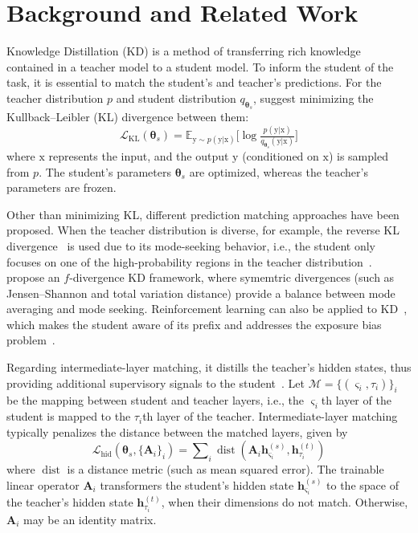 \section{Background and Related Work}
Knowledge Distillation (KD) is a method of transferring rich knowledge contained in a teacher model to a student model. To inform the student of the task, it is essential to match the student's and teacher's predictions.  For the teacher distribution $p$ and student distribution $q_{\bm\theta_s}$, \citet{hintonkd} suggest minimizing the Kullback--Leibler (KL) divergence between them: 
\begin{equation}
    \mathcal{L}_{\text{KL}}(\bm\theta_s) =  
    \mathbb{E}_{\mathrm y\sim p(\mathrm y| \mathrm x)}\big[
        \log{
            \tfrac{p(\mathrm y | \mathrm x)}
            {q_{\bm\theta_s}(\mathrm y | \mathrm x)}
        }
        \big]
\end{equation}
where $\mathrm x$ represents the input, and the output $\mathrm y$ (conditioned on $\mathrm x$) is sampled from $p$. The student's parameters $\bm\theta_s$ are optimized, whereas the teacher's parameters are frozen. 

Other than minimizing KL, different prediction matching approaches have been proposed.  When the teacher distribution is diverse, for example, the reverse KL divergence~\cite{engine,minillm} is used due to its mode-seeking behavior, i.e., the student only focuses on one of the high-probability regions in the teacher distribution~\cite{mode-seeking}. \citet{fdistill} propose an $f$-divergence KD framework, where symemtric divergences (such as Jensen--Shannon and total variation distance) provide a balance between mode averaging and mode seeking. Reinforcement learning can also be applied to KD~\cite{hao2022teacher,llmr}, which makes the student aware of its prefix and addresses the exposure bias problem~\cite{exp-bias}.

Regarding intermediate-layer matching, it distills the teacher's hidden states, thus providing additional supervisory signals to the student~\cite{patientkd}. Let $\mathcal M=\{(\varsigma_i, \tau_i)\}_{i}$ be the mapping between student and teacher layers, i.e., the $\varsigma_i$th layer of the student is mapped to the $\tau_i$th layer of the teacher. Intermediate-layer matching typically penalizes the distance between the matched layers, given by
\begin{equation}
    \mathcal L_{\text{hid}}( \bm\theta_s, \{\boldsymbol A_i\}_i) = \sum\nolimits_{i} \operatorname{dist}(\boldsymbol A_i \bm h_{\varsigma_i}^{(s)}, \boldsymbol h_{\tau_i}^{(t)}) 
\end{equation}
where $\operatorname{dist}$ is a distance metric (such as mean squared error). The trainable linear operator $\bm A_i$ transformers the student's hidden state $\bm h_{\varsigma_i}^{(s)}$ to the space of the teacher's hidden state $\boldsymbol h_{\tau_i}^{(t)}$, when their dimensions do not match. Otherwise, $\bm A_i$ may be an identity matrix.

